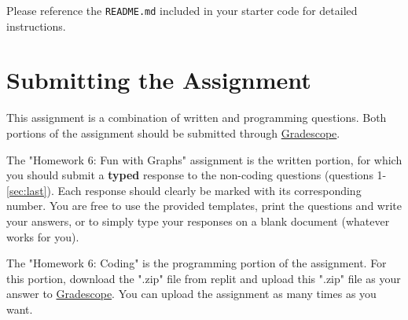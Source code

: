 \documentclass [12pt]{article}
\begin{document}
Please reference the \texttt{README.md} included in your starter code for detailed instructions.

\section*{Submitting the Assignment}

This assignment is a combination of written and programming questions. Both portions of the assignment should be submitted through \href{https://www.gradescope.com/courses/350304}{Gradescope}.

The "Homework 6: Fun with Graphs" assignment is the written portion, for which you should submit a \textbf{typed} response to the non-coding questions (questions 1-\ref{sec:last}). Each response should clearly be marked with its corresponding number. You are free to use the provided templates, print the questions and write your answers, or to simply type your responses on a blank document (whatever works for you).

The "Homework 6: Coding" is the programming portion of the assignment. For this portion, download the ".zip" file from replit and upload this ".zip" file as your answer to \href{https://www.gradescope.com/courses/350304}{Gradescope}. You can upload the assignment as many times as you want.
\end{document}
